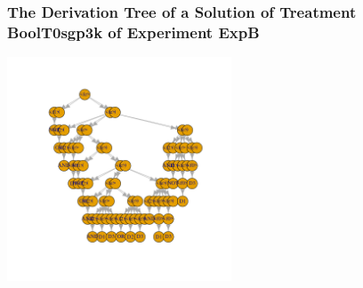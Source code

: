  \begin{frame}
 \frametitle{ The Derivation Tree of a Solution of Treatment BoolT0sgp3k of Experiment ExpB }
 \begin{center}
\includegraphics[width=0.5\textwidth, angle=0]
{ExpBDerivationTreeFigure001.pdf}
 \end{center}
 \label{report/ExpBDerivationTreeFigure001.pdf}  
 \end{frame}

